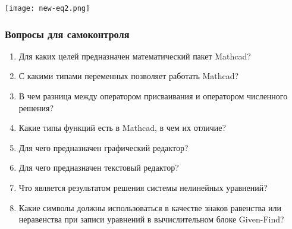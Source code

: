 \begin{center}
	\texttt{[image: new-eq2.png]}
\end{center}


\subsubsection*{Вопросы для самоконтроля}
\begin{enumerate}
	\item Для каких целей предназначен математический пакет Mathcad?
	\item С какими типами переменных позволяет работать Mathcad?
	\item В чем разница между оператором присваивания и оператором численного решения?
	\item Какие типы функций есть в Mathcad, в чем их отличие?
	\item Для чего предназначен графический редактор?
	\item Для чего предназначен текстовый редактор?
	\item Что является результатом решения системы нелинейных уравнений?
	\item Какие символы должны использоваться в качестве знаков равенства или неравенства при записи уравнений в вычислительном блоке Given-Find?
\end{enumerate}



